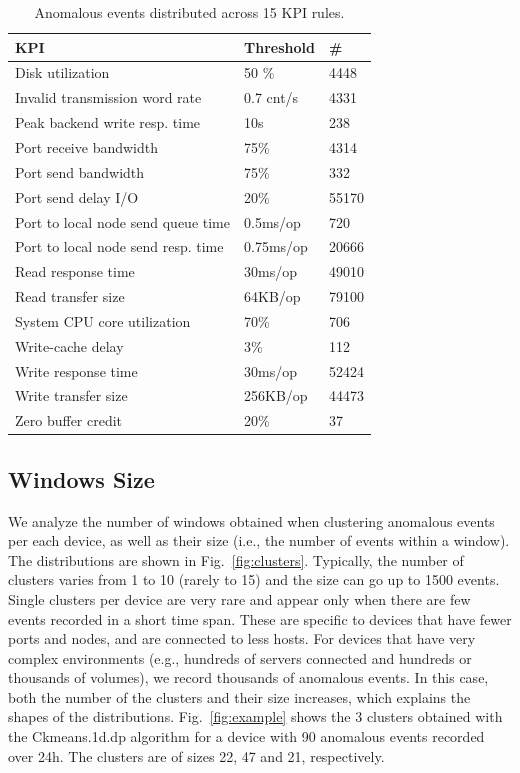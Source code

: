 \documentclass[letterpaper]{article} %
\begin{document}
\begin{table}
\begin{tabular}{| l | l |l|}
\hline
\textbf{KPI} & \textbf{Threshold} & \textbf{\#} \\
\hline
Disk utilization & 50 \% & 4448 \\
\hline
Invalid transmission word rate & 0.7 cnt/s &  4331 \\
\hline
Peak backend write resp. time & 10s & 238 \\
\hline
Port receive bandwidth & 75\% & 4314 \\
\hline
Port send bandwidth & 75\% & 332 \\
\hline
Port send delay I/O & 20\% & 55170 \\
\hline
Port to local node send queue time & 0.5ms/op & 720\\
\hline
Port to local node send resp. time & 0.75ms/op &20666\\
\hline
Read response time & 30ms/op &  49010 \\
\hline
Read transfer size & 64KB/op & 79100 \\
\hline
System CPU core utilization & 70\% & 706 \\
\hline
Write-cache delay & 3\% & 112 \\
\hline
Write response time & 30ms/op & 52424 \\
\hline
Write transfer size & 256KB/op & 44473 \\
\hline
Zero buffer credit & 20\% & 37 \\
\hline
\end{tabular}
\caption{Anomalous events distributed across 15 KPI rules.}
\label{datadesc}
\end{table}



\subsection{Windows Size}
We analyze the number of windows obtained when clustering anomalous events per each device, as well as their size (i.e., the number of events within a window). The distributions are shown in Fig.~\ref{fig:clusters}. Typically, the number of clusters varies from 1 to 10 (rarely to 15) and the size can go up to 1500 events. Single clusters per device are very rare and appear only when there are few events recorded in a short time span. These are specific to devices that have fewer ports and nodes, and are connected to less hosts. For devices that have very complex environments (e.g., hundreds of servers connected and hundreds or thousands of volumes), we record thousands of anomalous events. In this case, both the number of the clusters and their size increases, which explains the shapes of the distributions. Fig.~\ref{fig:example} shows the 3 clusters obtained with the Ckmeans.1d.dp algorithm for a device with 90 anomalous events recorded over 24h. The clusters are of sizes 22, 47 and 21, respectively.
\end{document}

